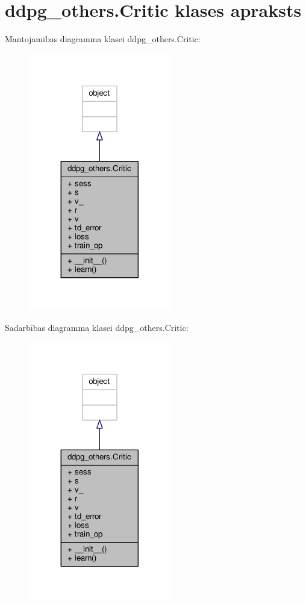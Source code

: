 \hypertarget{classddpg__others_1_1_critic}{}\section{ddpg\+\_\+others.\+Critic klases apraksts}
\label{classddpg__others_1_1_critic}


Mantojamības diagramma klasei ddpg\+\_\+others.\+Critic\+:
\nopagebreak
\begin{figure}[H]
\begin{center}
\leavevmode
\includegraphics[width=176pt]{classddpg__others_1_1_critic__inherit__graph}
\end{center}
\end{figure}


Sadarbības diagramma klasei ddpg\+\_\+others.\+Critic\+:
\nopagebreak
\begin{figure}[H]
\begin{center}
\leavevmode
\includegraphics[width=176pt]{classddpg__others_1_1_critic__coll__graph}
\end{center}
\end{figure}
